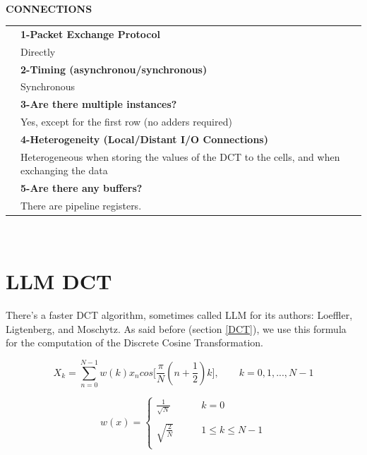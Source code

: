    \newpage{\large\textbf{ }}\vspace{10pt}\\
   {\large\textbf{CONNECTIONS}}\vspace{10pt}\\\begin{tabular}{ p{0.2cm} p{14.5cm}}
   	&\textbf{1-Packet Exchange Protocol}\\
   	&Directly\vspace{7pt}\\
   	&\textbf{2-Timing (asynchronou/synchronous)}\\
   	&Synchronous\vspace{7pt}\\
   	&\textbf{3-Are there multiple instances? }\\
   	&Yes, except for the first row (no adders required)\vspace{7pt}\\
   	&\textbf{4-Heterogeneity (Local/Distant I/O Connections)}\\
   	&Heterogeneous when storing the values of the DCT to the cells, and when exchanging the data\vspace{7pt}\\
   	&\textbf{5-Are there any buffers?}\\
   	&There are pipeline registers.
   \end{tabular}\vspace{14pt}\\
   \clearpage
   \section{LLM DCT}
   There's a faster DCT algorithm, sometimes called LLM for its authors: Loeffler, Ligtenberg, and Moschytz.
   As said before (section \ref{DCT}), we use this formula for the computation of the Discrete Cosine Transformation.
   \bigskip
   
     \begin{equation} \label{eq:dct_eq_1}	
     X_{k}= \sum_{n=0}^{N-1} w(k)x_{n}cos\bigg[\frac{\pi}{N} (n+\frac{1}{2})k\bigg], \qquad k=0,1,...,N-1
     \end{equation}
     
     
     \[
     w(x)=\left\{
     \begin{array}{ll}
     \frac{1}{\sqrt{N}} & \qquad k=0\\
     &\\
     \sqrt{\frac{2}{N}} & \qquad 1\leqslant k \leqslant N-1\\
     \end{array}
     \right.
     \]
     \bigskip
     
